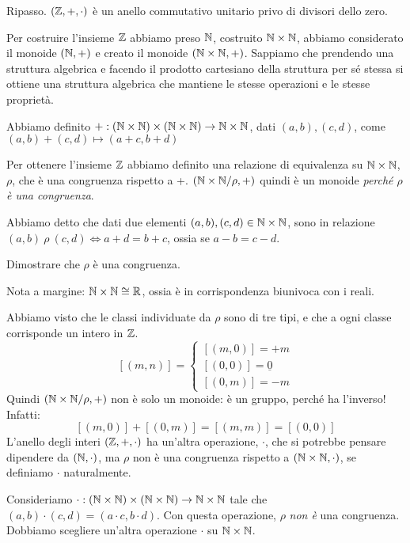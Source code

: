 Ripasso. $(\mathbb{Z}, +, \cdot)$ \`e un anello commutativo unitario privo di divisori dello zero.

Per costruire l'insieme $\mathbb{Z}$ abbiamo preso $\mathbb{N}$, costruito $\mathbb{N} \times \mathbb{N}$, abbiamo considerato il monoide $(\mathbb{N}, +)$ e creato il monoide $(\mathbb{N} \times \mathbb{N}, +)$. Sappiamo che prendendo una struttura algebrica e facendo il prodotto cartesiano della struttura per s\'e stessa si ottiene una struttura algebrica che mantiene le stesse operazioni e le stesse propriet\`a.

Abbiamo definito $+ : (\mathbb{N} \times \mathbb{N}) \times (\mathbb{N} \times \mathbb{N}) \to \mathbb{N} \times \mathbb{N}$, dati $(a,b), (c,d) $, come $ (a,b) + (c,d) \mapsto (a + c, b + d)$

Per ottenere l'insieme $\mathbb{Z}$ abbiamo definito una relazione di equivalenza su $\mathbb{N} \times \mathbb{N}$, $\rho$, che \`e una congruenza rispetto a +. $(\mathbb{N} \times \mathbb{N} / \rho, +)$ quindi \`e un monoide \textit{perch\'e $\rho$ \`e una congruenza}. 

Abbiamo detto che dati due elementi $(a,b),(c,d) \in \mathbb{N} \times \mathbb{N}$, sono in relazione $(a,b) \ \rho \ (c,d) \iff a + d = b + c$, ossia se $a - b = c - d$.
\begin{esercizio}
Dimostrare che $\rho$ \`e una congruenza.
\end{esercizio}
Nota a margine: $\mathbb{N} \times \mathbb{N} \cong \mathbb{R}$, ossia \`e in corrispondenza biunivoca con i reali.

Abbiamo visto che le classi individuate da $\rho$ sono di tre tipi, e che a ogni classe corrisponde un intero in $\mathbb{Z}$.
\[
[(m,n)] = 
\begin{cases}
[(m,0)] = +m \\
[(0,0)] = \underline{0} \\
[(0,m)] = -m
\end{cases}
\]
Quindi $(\mathbb{N} \times \mathbb{N} / \rho, +)$ non \`e solo un monoide: \`e un gruppo, perch\'e ha l'inverso! Infatti:
\[
[(m, 0)] + [(0, m)] = [(m, m)] = [(0,0)]
\]
L'anello degli interi $(\mathbb{Z}, +, \cdot)$ ha un'altra operazione, $\cdot$, che si potrebbe pensare dipendere da $(\mathbb{N}, \cdot)$, ma $\rho$ non \`e una congruenza rispetto a $(\mathbb{N} \times \mathbb{N}, \cdot)$, se definiamo $\cdot$ naturalmente.

Consideriamo $\cdot : (\mathbb{N} \times \mathbb{N}) \times (\mathbb{N} \times \mathbb{N}) \to \mathbb{N} \times \mathbb{N}$ tale che $(a, b) \cdot (c, d) = (a \cdot c, b \cdot d)$. Con questa operazione, $\rho$ \textit{non \`e} una congruenza. Dobbiamo scegliere un'altra operazione $\cdot$ su $\mathbb{N} \times \mathbb{N}$.

